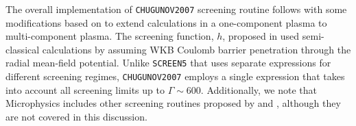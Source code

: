 \documentclass[preprint,times,tighten]{aastex631}
\newcommand{\microphysics}{{\sf Microphysics}}
\begin{document}
The overall implementation of {\tt CHUGUNOV2007} screening routine follows \cite{Chugunov_2007} with some modifications based on \cite{Yakovlev_2006} to extend calculations in a one-component plasma to multi-component plasma. The screening function, $h$, proposed in \cite{Chugunov_2007} used semi-classical calculations by assuming WKB Coulomb barrier penetration through the radial mean-field potential. Unlike {\tt SCREEN5} that uses separate expressions for different screening regimes, {\tt CHUGUNOV2007} employs a single expression that takes into account all screening limits up to $\Gamma \sim 600$. Additionally, we note that {\microphysics} includes other screening routines proposed by \cite{Chugunov_2009} and \cite{Chabrier:1998, Calder:2007}, although they are not covered in this discussion.




\end{document}

